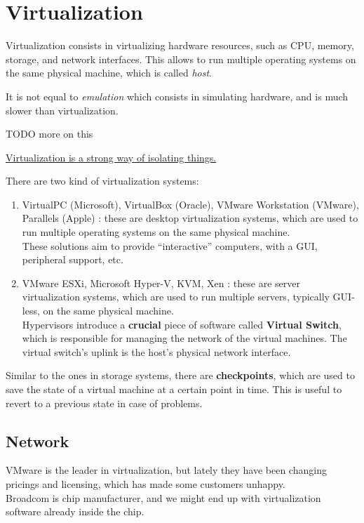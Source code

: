 \chapter{Virtualization}

Virtualization consists in virtualizing hardware resources, such as CPU, memory, storage, and network interfaces. This allows to run multiple operating systems on the same physical machine, which is called \textit{host}.

It is not equal to \textit{emulation} which consists in simulating hardware, and is much slower than virtualization.

TODO more on this

\ul{Virtualization is a strong way of isolating things.}

There are two kind of virtualization systems:
\begin{enumerate}
   \item VirtualPC (Microsoft), VirtualBox (Oracle), VMware Workstation (VMware), Parallels (Apple) : these are desktop virtualization systems, which are used to run multiple operating systems on the same physical machine.\\
   These solutions aim to provide ``interactive'' computers, with a GUI, peripheral support, etc. 
   \item VMware ESXi, Microsoft Hyper-V, KVM, Xen : these are server virtualization systems, which are used to run multiple servers, typically GUI-less, on the same physical machine.\\
   Hypervisors introduce a \textbf{crucial} piece of software called \textbf{Virtual Switch}, which is responsible for managing the network of the virtual machines.
   The virtual switch's uplink is the host's physical network interface.
\end{enumerate}

Similar to the ones in storage systems, there are \textbf{checkpoints}, which are used to save the state of a virtual machine at a certain point in time. This is useful to revert to a previous state in case of problems.

\section{Network}
VMware is the leader in virtualization, but lately they have been changing pricings and licensing, which has made some customers unhappy.\\
Broadcom is chip manufacturer, and we might end up with virtualization software already inside the chip. 

